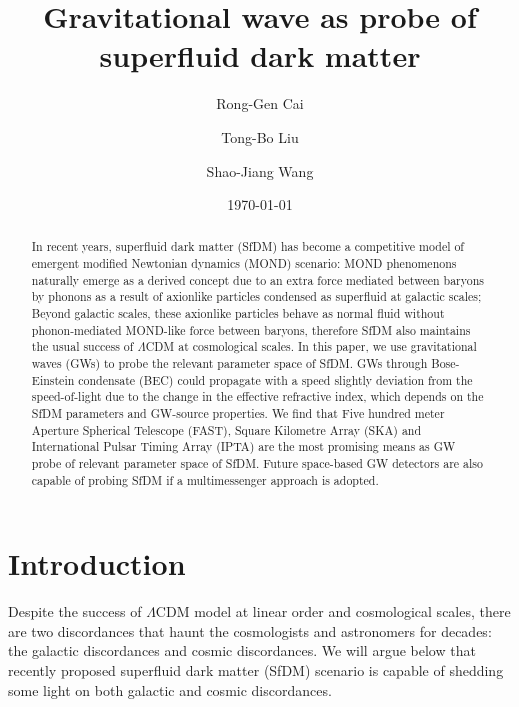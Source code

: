 \documentclass[aps,prd,twocolumn,10pt,groupedaddress]{revtex4-1}
\begin{document}
\title{Gravitational wave as probe of superfluid dark matter}
\author{Rong-Gen Cai}
\author{Tong-Bo Liu}
\author{Shao-Jiang Wang}
\date{\today}

\begin{abstract}
  In recent years, superfluid dark matter (SfDM) has become a competitive model of emergent modified Newtonian dynamics (MOND) scenario: MOND phenomenons  naturally emerge as a derived concept due to an extra force mediated between baryons by phonons as a result of axionlike particles condensed  as superfluid at galactic scales; Beyond galactic scales, these axionlike particles behave as normal fluid without phonon-mediated MOND-like force between baryons, therefore SfDM also maintains the usual success of $\Lambda$CDM at cosmological scales. In this paper, we use gravitational waves (GWs) to probe the relevant parameter space of SfDM. GWs through Bose-Einstein condensate (BEC) could propagate with a speed slightly deviation from the speed-of-light due to the change in the effective refractive index, which depends on the SfDM parameters and GW-source properties. We find that Five hundred meter Aperture Spherical Telescope (FAST), Square Kilometre Array (SKA) and International Pulsar Timing Array (IPTA) are the most promising means as GW probe of relevant parameter space of SfDM. Future space-based GW detectors are also capable of probing SfDM if a multimessenger approach is adopted.
\end{abstract}
\maketitle

\section{Introduction}

Despite the success of $\Lambda$CDM model at linear order and cosmological scales, there are two discordances that haunt the cosmologists and astronomers for decades: the galactic discordances and cosmic discordances. We will argue below that recently proposed superfluid dark matter (SfDM) scenario is capable of shedding some light on both galactic and cosmic discordances.
\end{document}
